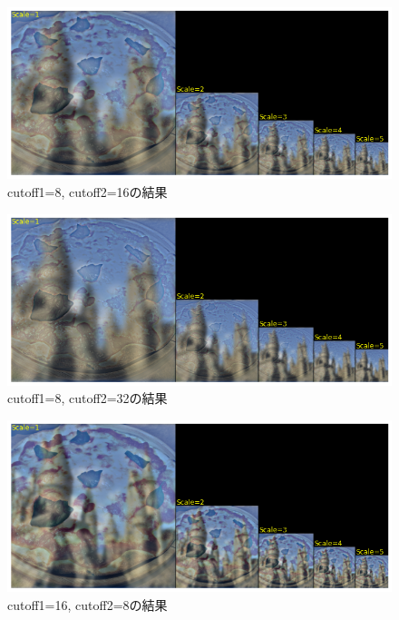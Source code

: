 \documentclass[12pt]{jarticle}
\begin{document}
\clearpage
\begin{figure}[h]
    \begin{center}
        \includegraphics[scale=0.7]{kadai4_3_9.png}
    \end{center}
    \caption{cutoff1=8, cutoff2=16の結果}
\end{figure}

\begin{figure}[h]
    \begin{center}
        \includegraphics[scale=0.7]{kadai4_3_10.png}
    \end{center}
    \caption{cutoff1=8, cutoff2=32の結果}
\end{figure}

\clearpage
\begin{figure}[h]
    \begin{center}
        \includegraphics[scale=0.7]{kadai4_3_11.png}
    \end{center}
    \caption{cutoff1=16, cutoff2=8の結果}
\end{figure}
\end{document}
